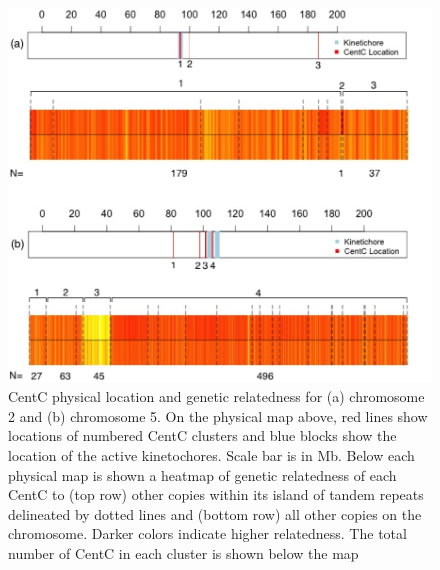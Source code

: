 \begin{figure}[h]
\centering
\includegraphics[width=1\textwidth]{Fig3_Heatmap}
\caption{CentC physical location and genetic relatedness for (a) chromosome 2 and (b) chromosome 5.  On the physical map above, red lines show locations of numbered CentC clusters and blue blocks show the location of the active kinetochores.  Scale bar is in Mb.  Below each physical map is shown a heatmap of genetic relatedness of each CentC to (top row) other copies within its island of tandem repeats delineated by dotted lines and (bottom row) all other copies on the chromosome.  Darker colors indicate higher relatedness.  The total number of CentC in each cluster is shown below the map
}
\label{heatmap}    
\end{figure}

